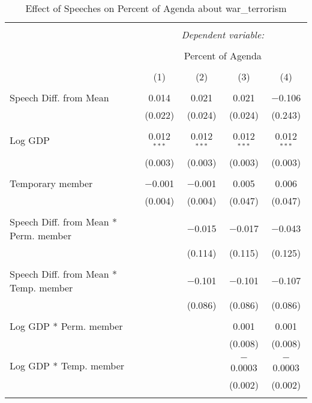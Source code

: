 
\begin{table}[!htbp] \centering 
  \caption{Effect of Speeches on Percent of Agenda about war_terrorism} 
  \label{} 
\begin{tabular}{@{\extracolsep{5pt}}lcccc} 
\\[-1.8ex]\hline 
\hline \\[-1.8ex] 
 & \multicolumn{4}{c}{\textit{Dependent variable:}} \\ 
\cline{2-5} 
\\[-1.8ex] & \multicolumn{4}{c}{Percent of Agenda} \\ 
\\[-1.8ex] & (1) & (2) & (3) & (4)\\ 
\hline \\[-1.8ex] 
 Speech Diff. from Mean & 0.014 & 0.021 & 0.021 & $-$0.106 \\ 
  & (0.022) & (0.024) & (0.024) & (0.243) \\ 
  & & & & \\ 
 Log GDP & 0.012$^{***}$ & 0.012$^{***}$ & 0.012$^{***}$ & 0.012$^{***}$ \\ 
  & (0.003) & (0.003) & (0.003) & (0.003) \\ 
  & & & & \\ 
 Temporary member & $-$0.001 & $-$0.001 & 0.005 & 0.006 \\ 
  & (0.004) & (0.004) & (0.047) & (0.047) \\ 
  & & & & \\ 
 Speech Diff. from Mean * Perm. member &  & $-$0.015 & $-$0.017 & $-$0.043 \\ 
  &  & (0.114) & (0.115) & (0.125) \\ 
  & & & & \\ 
 Speech Diff. from Mean * Temp. member &  & $-$0.101 & $-$0.101 & $-$0.107 \\ 
  &  & (0.086) & (0.086) & (0.086) \\ 
  & & & & \\ 
 Log GDP * Perm. member &  &  & 0.001 & 0.001 \\ 
  &  &  & (0.008) & (0.008) \\ 
  & & & & \\ 
 Log GDP * Temp. member &  &  & $-$0.0003 & $-$0.0003 \\ 
  &  &  & (0.002) & (0.002) \\ 
  & & & & \\ 

\end{tabular}
\end{table}

